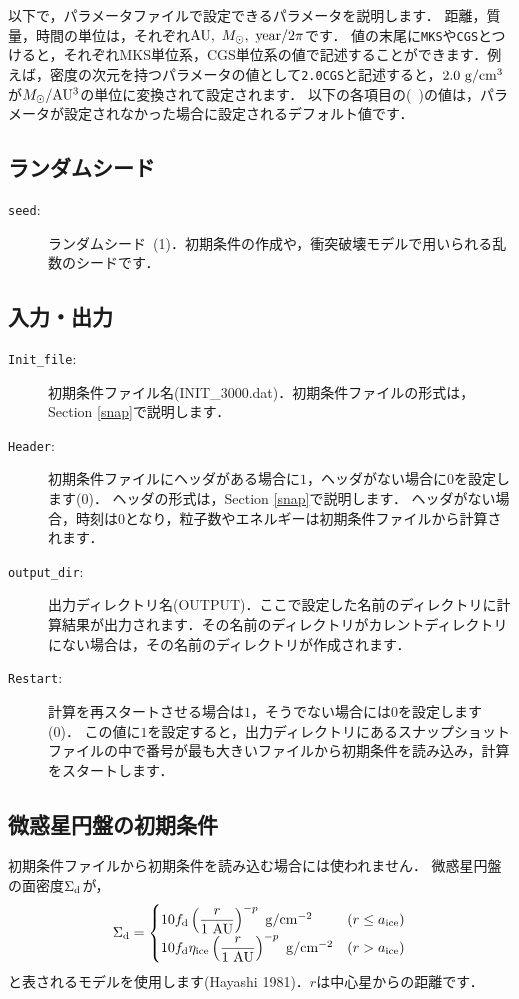 \documentclass[12pt,a4paper,dvipdfmx]{jsarticle}
\begin{document}
以下で，パラメータファイルで設定できるパラメータを説明します．
距離，質量，時間の単位は，それぞれ${\rm AU},\ M_{\odot},\ {\rm year}/2\pi$です．
値の末尾に\texttt{MKS}や\texttt{CGS}とつけると，それぞれMKS単位系，CGS単位系の値で記述することができます．例えば，密度の次元を持つパラメータの値として\texttt{2.0CGS}と記述すると，$2.0\ {\rm g/cm^{3}}$が$M_{\odot}/{\rm AU^{3}}$の単位に変換されて設定されます．
以下の各項目の(\ )の値は，パラメータが設定されなかった場合に設定されるデフォルト値です．

\subsection{ランダムシード}
\begin{description}
\item[\texttt{seed}:]
ランダムシード\ (1)．初期条件の作成や，衝突破壊モデルで用いられる乱数のシードです．
\end{description}

\subsection{入力・出力}
\begin{description}
\item[\texttt{Init\_file}:]
初期条件ファイル名(INIT\_3000.dat)．初期条件ファイルの形式は，Section \ref{snap}で説明します．
\item[\texttt{Header}:]
初期条件ファイルにヘッダがある場合に$1$，ヘッダがない場合に$0$を設定します(0)．
ヘッダの形式は，Section \ref{snap}で説明します．
ヘッダがない場合，時刻は$0$となり，粒子数やエネルギーは初期条件ファイルから計算されます．
\item[\texttt{output\_dir}:]
出力ディレクトリ名(OUTPUT)．ここで設定した名前のディレクトリに計算結果が出力されます．その名前のディレクトリがカレントディレクトリにない場合は，その名前のディレクトリが作成されます．
\item[\texttt{Restart}:]
計算を再スタートさせる場合は$1$，そうでない場合には$0$を設定します(0)．
この値に$1$を設定すると，出力ディレクトリにあるスナップショットファイルの中で番号が最も大きいファイルから初期条件を読み込み，計算をスタートします．

\end{description}

\subsection{微惑星円盤の初期条件}
初期条件ファイルから初期条件を読み込む場合には使われません．
微惑星円盤の面密度$\Sigma_{\rm d}$が，
\begin{equation}
\Sigma_{\rm d}=
\begin{cases}
10f_{\rm d}\left( \displaystyle\frac{r}{1\ {\rm AU}} \right)^{-p}\ {\rm g/cm^{-2}} & (r \leq  a_{\rm ice})\\
10f_{\rm d}\eta_{\rm ice}\left( \displaystyle\frac{r}{1\ {\rm AU}} \right)^{-p}\ {\rm g/cm^{-2}} & (r > a_{\rm ice})
\end{cases}
\label{sigmad}
\end{equation}
と表されるモデルを使用します(Hayashi 1981)．$r$は中心星からの距離です．
\end{document}

